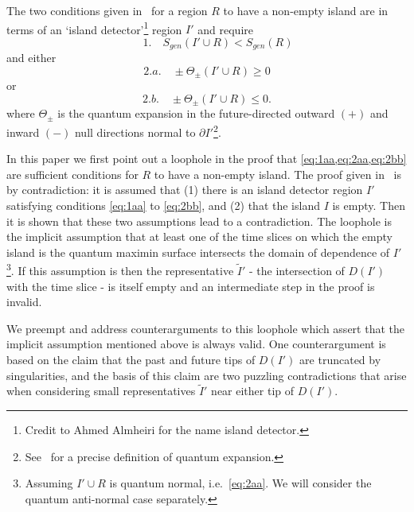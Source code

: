 \documentclass[a4paper,11pt]{article}
\def\bne{\begin{equation}}
\def\ene{\end{equation}}
\newcommand{\del}{\partial}
\begin{document}
The two conditions given in~\cite{Bousso2021} for a region $R$ to have a non-empty island are in terms of an `island detector'\footnote{Credit to Ahmed Almheiri for the name island detector.} region $I'$ and require
\bne \label{eq:1aa} \qquad 1. \quad  S_{gen} (I' \cup R) < S_{gen} (R) \ene
and either
\bne  2.a. \label{eq:2aa}\quad \pm \Theta_\pm (I' \cup R) \geq 0 \ene
or
\bne 2.b. \label{eq:2bb}\quad  \pm \Theta_\pm (I' \cup R) \leq 0. \ene
where $\Theta_\pm$ is the quantum expansion in the future-directed outward $(+)$ and inward $(-)$ null directions normal to $\del I'$\footnote{See~\cite{Bousso2015} for a precise definition of quantum expansion.}.

In this paper we first point out a loophole in the proof that \cref{eq:1aa,eq:2aa,eq:2bb} are sufficient conditions for $R$ to have a non-empty island.
The proof given in~\cite{Bousso2021} is by contradiction: it is assumed that (1) there is an island detector region $I'$ satisfying conditions \eqref{eq:1aa} to \eqref{eq:2bb}, and (2) that the island $I$ is empty. Then it is shown that these two assumptions lead to a contradiction. The loophole is the implicit assumption that at least one of the time slices on which the empty island is the quantum maximin surface intersects the domain of dependence of $I'$\footnote{Assuming $I' \cup R$ is quantum normal, i.e.~\eqref{eq:2aa}. We will consider the quantum anti-normal case separately.}. If this assumption is  then the representative $\tilde{I}'$ - the intersection of $D(I')$ with the time slice - is itself empty and an intermediate step in the proof is invalid.  

We preempt and address counterarguments to this loophole which assert that the implicit assumption mentioned above is always valid. One counterargument is based on the claim that the past and future tips of $D(I')$ are truncated by singularities, and the basis of this claim are two puzzling contradictions that arise when considering small representatives $\tilde{I}'$ near either tip of $D(I')$.
\end{document}
